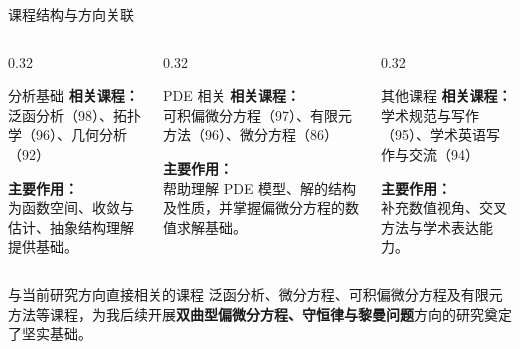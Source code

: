 \documentclass{beamer}
\begin{document}
\begin{frame}{课程结构与方向关联}
\small

\begin{columns}[T,totalwidth=\textwidth]
    \begin{column}{0.32\textwidth}
        \begin{block}{分析基础}
        \footnotesize
        \textbf{相关课程：}\\
        泛函分析（98）、拓扑学（96）、几何分析（92）

        \vspace{1em}
        \textbf{主要作用：}\\
        为函数空间、收敛与估计、抽象结构理解提供基础。
        \vspace{1.8em}
        \end{block}
    \end{column}

    \begin{column}{0.32\textwidth}
        \begin{block}{PDE 相关}
        \footnotesize
        \textbf{相关课程：}\\
        可积偏微分方程（97）、有限元方法（96）、微分方程（86）

        \vspace{0.5em}
        \textbf{主要作用：}\\
        帮助理解 PDE 模型、解的结构及性质，并掌握偏微分方程的数值求解基础。
        \end{block}
    \end{column}


    \begin{column}{0.32\textwidth}
        \begin{block}{其他课程}
        \footnotesize
        \textbf{相关课程：}\\
        学术规范与写作（95）、学术英语写作与交流（94）

        \vspace{1.5em}
        \textbf{主要作用：}\\
        补充数值视角、交叉方法与学术表达能力。
        \vspace{1.3em}
        \end{block}
    \end{column}
\end{columns}

\vspace{0.3em}

\begin{block}{与当前研究方向直接相关的课程}
\footnotesize
泛函分析、微分方程、可积偏微分方程及有限元方法等课程，为我后续开展\textbf{双曲型偏微分方程、守恒律与黎曼问题}方向的研究奠定了坚实基础。
\end{block}

\end{frame}
\end{document}
